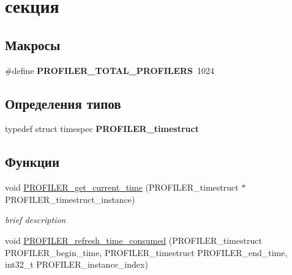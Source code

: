 \hypertarget{group___xD0_x9F_xD0_xBE_xD1_x80_xD1_x82_xD0_xB8_xD1_x80_xD1_x83_xD0_xB5_xD0_xBC_xD0_xB0_xD1_x8F}{\section{секция}
\label{group___xD0_x9F_xD0_xBE_xD1_x80_xD1_x82_xD0_xB8_xD1_x80_xD1_x83_xD0_xB5_xD0_xBC_xD0_xB0_xD1_x8F}
}
\subsection*{Макросы}
\begin{DoxyCompactItemize}
\item 
\hypertarget{group___xD0_x9F_xD0_xBE_xD1_x80_xD1_x82_xD0_xB8_xD1_x80_xD1_x83_xD0_xB5_xD0_xBC_xD0_xB0_xD1_x8F_ga775939d541e95ea75e6e7066a1cc6bcb}{\#define {\bfseries \-P\-R\-O\-F\-I\-L\-E\-R\-\_\-\-T\-O\-T\-A\-L\-\_\-\-P\-R\-O\-F\-I\-L\-E\-R\-S}~1024}\label{group___xD0_x9F_xD0_xBE_xD1_x80_xD1_x82_xD0_xB8_xD1_x80_xD1_x83_xD0_xB5_xD0_xBC_xD0_xB0_xD1_x8F_ga775939d541e95ea75e6e7066a1cc6bcb}

\end{DoxyCompactItemize}
\subsection*{Определения типов}
\begin{DoxyCompactItemize}
\item 
\hypertarget{group___xD0_x9F_xD0_xBE_xD1_x80_xD1_x82_xD0_xB8_xD1_x80_xD1_x83_xD0_xB5_xD0_xBC_xD0_xB0_xD1_x8F_gae02193769f3b21a09fc0d5035e566a75}{typedef struct timespec {\bfseries \-P\-R\-O\-F\-I\-L\-E\-R\-\_\-timestruct}}\label{group___xD0_x9F_xD0_xBE_xD1_x80_xD1_x82_xD0_xB8_xD1_x80_xD1_x83_xD0_xB5_xD0_xBC_xD0_xB0_xD1_x8F_gae02193769f3b21a09fc0d5035e566a75}

\end{DoxyCompactItemize}
\subsection*{Функции}
\begin{DoxyCompactItemize}
\item 
void \hyperlink{group___xD0_x9F_xD0_xBE_xD1_x80_xD1_x82_xD0_xB8_xD1_x80_xD1_x83_xD0_xB5_xD0_xBC_xD0_xB0_xD1_x8F_ga106b837099d8b52043148fa42592608b}{\-P\-R\-O\-F\-I\-L\-E\-R\-\_\-get\-\_\-current\-\_\-time} (\-P\-R\-O\-F\-I\-L\-E\-R\-\_\-timestruct $\ast$\-P\-R\-O\-F\-I\-L\-E\-R\-\_\-timestruct\-\_\-instance)
\begin{DoxyCompactList}\small\item\em brief description \end{DoxyCompactList}\item 
void \hyperlink{group___xD0_x9F_xD0_xBE_xD1_x80_xD1_x82_xD0_xB8_xD1_x80_xD1_x83_xD0_xB5_xD0_xBC_xD0_xB0_xD1_x8F_ga0072e0d84e203ad6499be54f4b6e14ee}{\-P\-R\-O\-F\-I\-L\-E\-R\-\_\-refresh\-\_\-time\-\_\-consumed} (\-P\-R\-O\-F\-I\-L\-E\-R\-\_\-timestruct \-P\-R\-O\-F\-I\-L\-E\-R\-\_\-begin\-\_\-time, \-P\-R\-O\-F\-I\-L\-E\-R\-\_\-timestruct \-P\-R\-O\-F\-I\-L\-E\-R\-\_\-end\-\_\-time, int32\-\_\-t \-P\-R\-O\-F\-I\-L\-E\-R\-\_\-instance\-\_\-index)
\end{DoxyCompactItemize}


